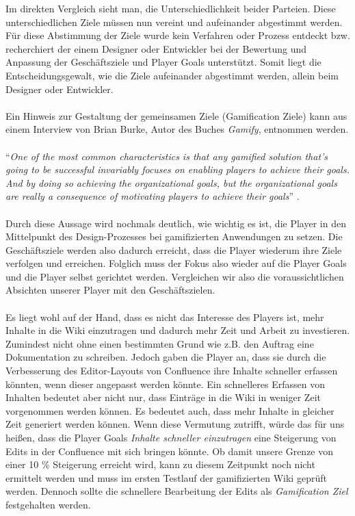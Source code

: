 \documentclass[a4paper,12pt,twoside]{scrartcl}
\begin{document}
Im direkten Vergleich sieht man, die Unterschiedlichkeit beider Parteien. Diese unterschiedlichen Ziele müssen nun vereint und aufeinander abgestimmt werden. Für diese Abstimmung der Ziele wurde kein Verfahren oder Prozess entdeckt bzw. recherchiert der einem Designer oder Entwickler bei der Bewertung und Anpassung der Geschäftsziele und Player Goals unterstützt. Somit liegt die Entscheidungsgewalt, wie die Ziele aufeinander abgestimmt werden, allein beim Designer oder Entwickler.
\\\\
Ein Hinweis zur Gestaltung der gemeinsamen Ziele (Gamification Ziele) kann aus einem Interview von Brian Burke, Autor des Buches \textit{Gamify}, entnommen werden.
\\\\
\enquote{\textit{One of the most common characteristics is that any gamified solution that's going to be successful invariably focuses on enabling players to achieve their goals. And by doing so achieving the organizational goals, but the organizational goals are really a consequence of motivating players to achieve their goals}} \cite{Kapko14}.
\\\\
Durch diese Aussage wird nochmals deutlich, wie wichtig es ist, die Player in den Mittelpunkt des Design-Prozesses bei gamifizierten Anwendungen zu setzen. Die Geschäftsziele werden also dadurch erreicht, dass die Player wiederum ihre Ziele verfolgen und erreichen. Folglich muss der Fokus also wieder auf die Player Goals und die Player selbst gerichtet werden. Vergleichen wir also die voraussichtlichen Absichten unserer Player mit den Geschäftszielen.        
\\\\
Es liegt wohl auf der Hand, dass es nicht das Interesse des Players ist, mehr Inhalte in die Wiki einzutragen und dadurch mehr Zeit und Arbeit zu investieren. Zumindest nicht ohne einen bestimmten Grund wie z.B. den Auftrag eine Dokumentation zu schreiben. Jedoch gaben die Player an, dass sie durch die Verbesserung des Editor-Layouts von Confluence ihre Inhalte schneller erfassen könnten, wenn dieser angepasst werden könnte. Ein schnelleres Erfassen von Inhalten bedeutet aber nicht nur, dass Einträge in die Wiki in weniger Zeit vorgenommen werden können. Es bedeutet auch, dass mehr Inhalte in gleicher Zeit generiert werden können. Wenn diese Vermutung zutrifft, würde das für uns heißen, dass die Player Goals \textit{Inhalte schneller einzutragen} eine Steigerung von Edits in der Confluence mit sich bringen könnte. Ob damit unsere Grenze von einer 10 \% Steigerung erreicht wird, kann zu diesem Zeitpunkt noch nicht ermittelt werden und muss im ersten Testlauf der gamifizierten Wiki geprüft werden. Dennoch sollte die schnellere Bearbeitung der Edits als \textit{Gamification Ziel} festgehalten werden.
\end{document}
